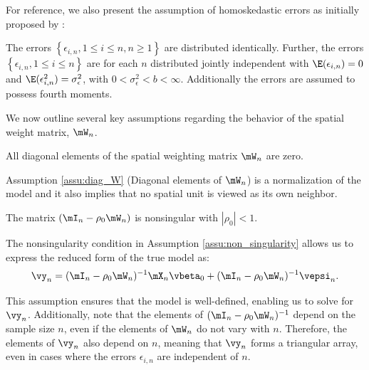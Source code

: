 \documentclass[english,12pt]{book}\usepackage[]{graphicx}\usepackage[]{xcolor}
\begin{document}
For reference, we also present the assumption of homoskedastic errors as initially proposed by \cite{kelejian1998generalized}:

\begin{assumption}\label{assu:errors_homoskedastic}
The errors  $\left\lbrace \epsilon_{i,n}, 1 \leq i \leq n, n\geq 1\right\rbrace$ are distributed identically. Further, the errors $\left\lbrace \epsilon_{i,n}, 1 \leq i \leq n\right\rbrace$ are for each $n$ distributed jointly independent with  $\E(\epsilon_{i,n})= 0$ and $\E(\epsilon_{i,n}^2) = \sigma^2_{\epsilon}$, with $0 < \sigma^2_{\epsilon}  < b <\infty$. Additionally the errors are assumed to possess fourth moments.
\end{assumption}

We now outline several key assumptions regarding the behavior of the spatial weight matrix, $\mW_n$.

\begin{assumption}\label{assu:diag_W}
All diagonal elements of the spatial weighting matrix $\mW_n$ are zero.
\end{assumption}

Assumption \ref{assu:diag_W} (Diagonal elements of $\mW_n$) is a normalization of the model and it also implies that no spatial unit is viewed as its own neighbor. 

\begin{assumption}\label{assu:non_singularity}
The matrix $(\mI_n - \rho_0\mW_n)$ is nonsingular with $\left|\rho_0 \right|<1$.
\end{assumption}

The nonsingularity condition in Assumption \ref{assu:non_singularity} allows us to express the reduced form of the true model as:
\begin{equation*}
  \vy_n = (\mI_n - \rho_0\mW_n)^{-1}\mX_n\vbeta_0 + (\mI_n - \rho_0\mW_n)^{-1}\vepsi_n.
\end{equation*}

This assumption ensures that the model is well-defined, enabling us to solve for $\vy_n$. Additionally, \cite{kelejian1998generalized} note that the elements of $(\mI_n - \rho_0\mW_n)^{-1}$ depend on the sample size $n$, even if the elements of $\mW_n$ do not vary with $n$. Therefore, the elements of $\vy_n$ also depend on $n$, meaning that $\vy_n$ forms a triangular array, even in cases where the errors $\epsilon_{i,n}$ are independent of $n$. 
\end{document}
